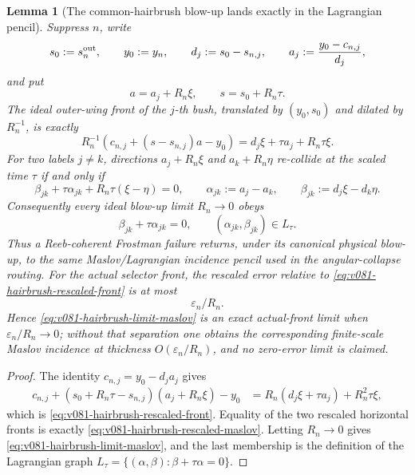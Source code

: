 \documentclass[10pt]{article}
\newtheorem{lemma}[theorem]{Lemma}
\begin{document}
\begin{lemma}[The common-hairbrush blow-up lands exactly in the Lagrangian pencil]
\label{lem:v081-hairbrush-maslov-blowup}
Suppress \(n\), write
\[
s_0:=s_n^{\rm out},
\qquad
y_0:=y_n,
\qquad
d_j:=s_0-s_{n,j},
\qquad
a_j:=\frac{y_0-c_{n,j}}{d_j},
\]
and put
\[
a=a_j+R_n\xi,
\qquad
s=s_0+R_n\tau.
\]
The ideal outer-wing front of the \(j\)-th bush, translated by \((y_0,s_0)\) and dilated by
\(R_n^{-1}\), is exactly
\begin{equation}
\label{eq:v081-hairbrush-rescaled-front}
\boxed{
R_n^{-1}
\left(
c_{n,j}+(s-s_{n,j})a-y_0
\right)
=
d_j\xi+\tau a_j+R_n\tau\xi.
}
\end{equation}
For two labels \(j\ne k\), directions
\(a_j+R_n\xi\) and \(a_k+R_n\eta\) re-collide at the scaled time \(\tau\) if and only if
\begin{equation}
\label{eq:v081-hairbrush-rescaled-maslov}
\boxed{
\beta_{jk}+\tau\alpha_{jk}
+R_n\tau(\xi-\eta)
=0,
\qquad
\alpha_{jk}:=a_j-a_k,
\qquad
\beta_{jk}:=d_j\xi-d_k\eta.
}
\end{equation}
Consequently every ideal blow-up limit \(R_n\to0\) obeys
\begin{equation}
\label{eq:v081-hairbrush-limit-maslov}
\boxed{
\beta_{jk}+\tau\alpha_{jk}=0,
\qquad
(\alpha_{jk},\beta_{jk})\in L_\tau.
}
\end{equation}
Thus a Reeb-coherent Frostman failure returns, under its canonical physical blow-up, to the same
Maslov/Lagrangian incidence pencil used in the angular-collapse routing.
For the actual selector front, the rescaled error relative to
\eqref{eq:v081-hairbrush-rescaled-front} is at most
\[
\varepsilon_n/R_n.
\]
Hence \eqref{eq:v081-hairbrush-limit-maslov} is an exact actual-front limit when
\(\varepsilon_n/R_n\to0\); without that separation one obtains the corresponding finite-scale
Maslov incidence at thickness \(O(\varepsilon_n/R_n)\), and no zero-error limit is claimed.
\end{lemma}

\begin{proof}
The identity \(c_{n,j}=y_0-d_ja_j\) gives
\[
\begin{aligned}
c_{n,j}+(s_0+R_n\tau-s_{n,j})(a_j+R_n\xi)-y_0
&=
R_n(d_j\xi+\tau a_j)+R_n^2\tau\xi,
\end{aligned}
\]
which is \eqref{eq:v081-hairbrush-rescaled-front}.  Equality of the two rescaled horizontal
fronts is exactly \eqref{eq:v081-hairbrush-rescaled-maslov}.  Letting \(R_n\to0\) gives
\eqref{eq:v081-hairbrush-limit-maslov}, and the last membership is the definition of the
Lagrangian graph \(L_\tau=\{(\alpha,\beta):\beta+\tau\alpha=0\}\).
\end{proof}
\end{document}
